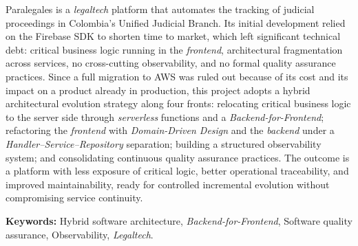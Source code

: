Paralegales is a \textit{legaltech} platform that automates the tracking of judicial proceedings in Colombia's Unified Judicial Branch. Its initial development relied on the Firebase SDK to shorten time to market, which left significant technical debt: critical business logic running in the \textit{frontend}, architectural fragmentation across services, no cross-cutting observability, and no formal quality assurance practices. Since a full migration to AWS was ruled out because of its cost and its impact on a product already in production, this project adopts a hybrid architectural evolution strategy along four fronts: relocating critical business logic to the server side through \textit{serverless} functions and a \textit{Backend-for-Frontend}; refactoring the \textit{frontend} with \textit{Domain-Driven Design} and the \textit{backend} under a \textit{Handler--Service--Repository} separation; building a structured observability system; and consolidating continuous quality assurance practices. The outcome is a platform with less exposure of critical logic, better operational traceability, and improved maintainability, ready for controlled incremental evolution without compromising service continuity.

\vspace{1em}

\textbf{Keywords:} Hybrid software architecture, \textit{Backend-for-Frontend}, Software quality assurance, Observability, \textit{Legaltech}.

\endgroup
